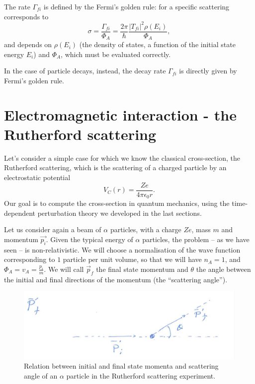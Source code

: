 The rate $\Gamma_{fi}$ is defined by the Fermi's golden rule: for a specific scattering corresponds to
\begin{equation*}
    \sigma= \frac{\Gamma_{fi}}{\Phi_A} = \frac{2\pi}{\hslash}\frac{|T_{fi}|^2\rho(E_{i})}{\Phi_A},
\end{equation*}
and depends on $\rho(E_i)$ (the density of states, a function of the initial state energy $E_i$) and $\Phi_A$, which must be evaluated correctly.

In the case of particle decays, instead, the decay rate $\Gamma_{fi}$ is directly given by Fermi's golden rule.

\section{Electromagnetic interaction - the Rutherford scattering}
Let's consider a simple case for which we know the classical cross-section, the Rutherford scattering, which is the scattering of a charged particle by an electrostatic potential
\begin{equation*}
    V_{C}(r) = \frac{Ze}{4\pi\epsilon_0r}.
\end{equation*}
Our goal is to compute the cross-section in quantum mechanics, using the time-dependent perturbation theory we developed in the last sections.

Let us consider again a beam of  $\alpha$ particles, with a charge $Ze$, mass $m$ and momentum $\Vec{p_i}$. Given the typical energy of $\alpha$ particles, the problem -- as we have seen -- is non-relativistic.
 We will choose a normalisation of the wave function corresponding to $1$ particle per unit volume, so that we will have $n_A = 1$, and $\Phi_{A} = v_{A} = \frac{p_i}{m}$. We will call $\Vec{p}_f$ the final state momentum and $\theta$ the angle between the initial and final directions of the momentum (the ``scattering angle'').
\begin{figure}[h]
    \centering
    \includegraphics[scale=0.25]{Figures/qscat8}
    \caption{Relation between initial and final state momenta and scattering angle of an $\alpha$ particle in the Rutherford scattering experiment.}
    \label{fig:qscat-fig8}
\end{figure}

